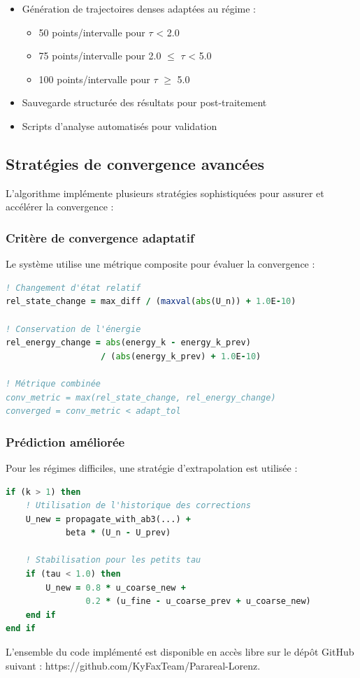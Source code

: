 \begin{itemize}
    \item Génération de trajectoires denses adaptées au régime :
    \begin{itemize}
        \item 50 points/intervalle pour $\tau$ < 2.0
        \item 75 points/intervalle pour 2.0 $\leq$ $\tau$ < 5.0
        \item 100 points/intervalle pour $\tau$ $\geq$ 5.0
    \end{itemize}
    \item Sauvegarde structurée des résultats pour post-traitement
    \item Scripts d'analyse automatisés pour validation
\end{itemize}

\subsection{Stratégies de convergence avancées}
L'algorithme implémente plusieurs stratégies sophistiquées pour assurer et accélérer la convergence :

\subsubsection{Critère de convergence adaptatif}
Le système utilise une métrique composite pour évaluer la convergence :

\begin{lstlisting}[language=Fortran,caption=Critère de convergence hybride]
! Changement d'état relatif
rel_state_change = max_diff / (maxval(abs(U_n)) + 1.0E-10)

! Conservation de l'énergie
rel_energy_change = abs(energy_k - energy_k_prev) 
                   / (abs(energy_k_prev) + 1.0E-10)

! Métrique combinée
conv_metric = max(rel_state_change, rel_energy_change)
converged = conv_metric < adapt_tol
\end{lstlisting}

\subsubsection{Prédiction améliorée}
Pour les régimes difficiles, une stratégie d'extrapolation est utilisée :

\begin{lstlisting}[language=Fortran,caption=Extrapolation pour prédiction]
if (k > 1) then
    ! Utilisation de l'historique des corrections
    U_new = propagate_with_ab3(...) + 
            beta * (U_n - U_prev)
    
    ! Stabilisation pour les petits tau
    if (tau < 1.0) then
        U_new = 0.8 * u_coarse_new + 
                0.2 * (u_fine - u_coarse_prev + u_coarse_new)
    end if
end if
\end{lstlisting}


L'ensemble du code implémenté est disponible en accès libre sur le dépôt GitHub suivant : https://github.com/KyFaxTeam/Parareal-Lorenz. 
